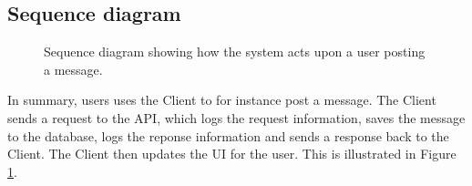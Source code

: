 \subsection{Sequence diagram}

\begin{figure}[H]
    \centering
    \makebox[\linewidth]{
    }
    \caption{Sequence diagram showing how the system acts upon 
    a user posting a message.}
    \label{fig:seq_diagram}
\end{figure}

In summary, users uses the Client to for instance post a message.
The Client sends a request to the API, which logs the request 
information, saves the message to the database, 
logs the reponse information and sends a response back to the 
Client. The Client then updates the UI for the user.
This is illustrated in Figure \ref{fig:seq_diagram}.
